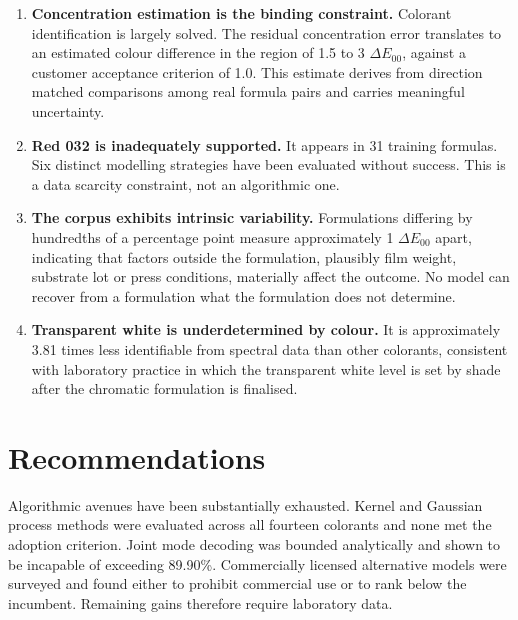 \documentclass[11pt,a4paper]{article}
\begin{document}
\begin{enumerate}[leftmargin=*,itemsep=4pt]

\item \textbf{Concentration estimation is the binding constraint.} Colorant
identification is largely solved. The residual concentration error translates to
an estimated colour difference in the region of 1.5 to 3 $\Delta E_{00}$, against
a customer acceptance criterion of 1.0. This estimate derives from direction
matched comparisons among real formula pairs and carries meaningful uncertainty.

\item \textbf{Red 032 is inadequately supported.} It appears in 31 training
formulas. Six distinct modelling strategies have been evaluated without success.
This is a data scarcity constraint, not an algorithmic one.

\item \textbf{The corpus exhibits intrinsic variability.} Formulations differing
by hundredths of a percentage point measure approximately 1 $\Delta E_{00}$
apart, indicating that factors outside the formulation, plausibly film weight,
substrate lot or press conditions, materially affect the outcome. No model can
recover from a formulation what the formulation does not determine.

\item \textbf{Transparent white is underdetermined by colour.} It is
approximately 3.81 times less identifiable from spectral data than other
colorants, consistent with laboratory practice in which the transparent white
level is set by shade after the chromatic formulation is finalised.

\end{enumerate}

\section{Recommendations}

Algorithmic avenues have been substantially exhausted. Kernel and Gaussian
process methods were evaluated across all fourteen colorants and none met the
adoption criterion. Joint mode decoding was bounded analytically and shown to be
incapable of exceeding 89.90\%. Commercially licensed alternative models were
surveyed and found either to prohibit commercial use or to rank below the
incumbent. Remaining gains therefore require laboratory data.
\end{document}
